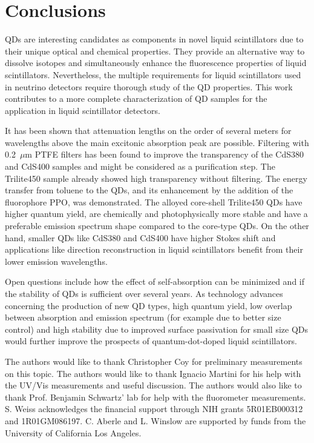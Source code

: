 \documentclass[cits]{JINST}
\begin{document}
\section{Conclusions}

QDs are interesting candidates as components in novel liquid scintillators due to their unique optical and chemical properties. They provide an alternative way to dissolve isotopes and simultaneously enhance the fluorescence properties of liquid scintillators. Nevertheless, the multiple requirements for liquid scintillators used in neutrino detectors require thorough study of the QD properties. This work contributes to a more complete characterization of QD samples for the application in liquid scintillator detectors. 

It has been shown that attenuation lengths on the order of several meters for wavelengths above the main excitonic absorption peak are possible. Filtering with 0.2~$\mu$m PTFE filters has been found to improve the transparency of the CdS380 and CdS400 samples and might be considered as a purification step. The Trilite450 sample already showed high transparency without filtering. The energy transfer from toluene to the QDs, and its enhancement by the addition of the fluorophore PPO, was demonstrated. The alloyed core-shell Trilite450 QDs have higher quantum yield, are chemically and photophysically more stable and have a preferable emission spectrum shape compared to the core-type QDs. On the other hand, smaller QDs like CdS380 and CdS400 have higher Stokes shift and applications like direction reconstruction in liquid scintillators benefit from their lower emission wavelengths. 

Open questions include how the effect of self-absorption can be minimized and if the stability of QDs is sufficient over several years. As technology advances concerning the production of new QD types, high quantum yield, low overlap between absorption and emission spectrum (for example due to better size control) and high stability due to improved surface passivation for small size QDs would further improve the prospects of quantum-dot-doped liquid scintillators.

\acknowledgments
The authors would like to thank Christopher Coy for preliminary measurements on this topic. The authors would like to thank Ignacio Martini for his help with the UV/Vis measurements and useful discussion. The authors would also like to thank Prof. Benjamin Schwartz' lab for help with the fluorometer measurements. S. Weiss acknowledges the financial support through NIH grants 5R01EB000312 and 1R01GM086197. C. Aberle and L. Winslow are supported by funds from the University of California Los Angeles.
\end{document}

